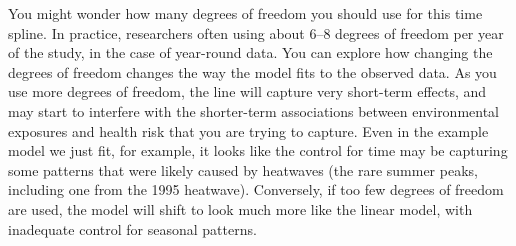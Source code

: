 \documentclass[
]{book}
\newenvironment{Shaded}{\begin{snugshade}}{\end{snugshade}}
\newcommand{\CommentTok}[1]{\textcolor[rgb]{0.56,0.35,0.01}{\textit{#1}}}
\newcommand{\DataTypeTok}[1]{\textcolor[rgb]{0.13,0.29,0.53}{#1}}
\newcommand{\DecValTok}[1]{\textcolor[rgb]{0.00,0.00,0.81}{#1}}
\newcommand{\FloatTok}[1]{\textcolor[rgb]{0.00,0.00,0.81}{#1}}
\newcommand{\KeywordTok}[1]{\textcolor[rgb]{0.13,0.29,0.53}{\textbf{#1}}}
\newcommand{\NormalTok}[1]{#1}
\newcommand{\OperatorTok}[1]{\textcolor[rgb]{0.81,0.36,0.00}{\textbf{#1}}}
\newcommand{\StringTok}[1]{\textcolor[rgb]{0.31,0.60,0.02}{#1}}
\begin{document}
You might wonder how many degrees of freedom you should use for this time spline. In practice,
researchers often using about 6--8 degrees of freedom per year of the study, in
the case of year-round data. You can explore how changing the degrees of freedom
changes the way the model fits to the observed data. As you use more degrees of
freedom, the line will capture very short-term effects, and may start to
interfere with the shorter-term associations between environmental exposures and
health risk that you are trying to capture. Even in the example model we just
fit, for example, it looks like the control for time may be capturing some
patterns that were likely caused by heatwaves (the rare summer peaks, including
one from the 1995 heatwave). Conversely, if too few degrees of freedom are used,
the model will shift to look much more like the linear model, with inadequate
control for seasonal patterns.

\begin{Shaded}
\end{Shaded}
\end{document}
